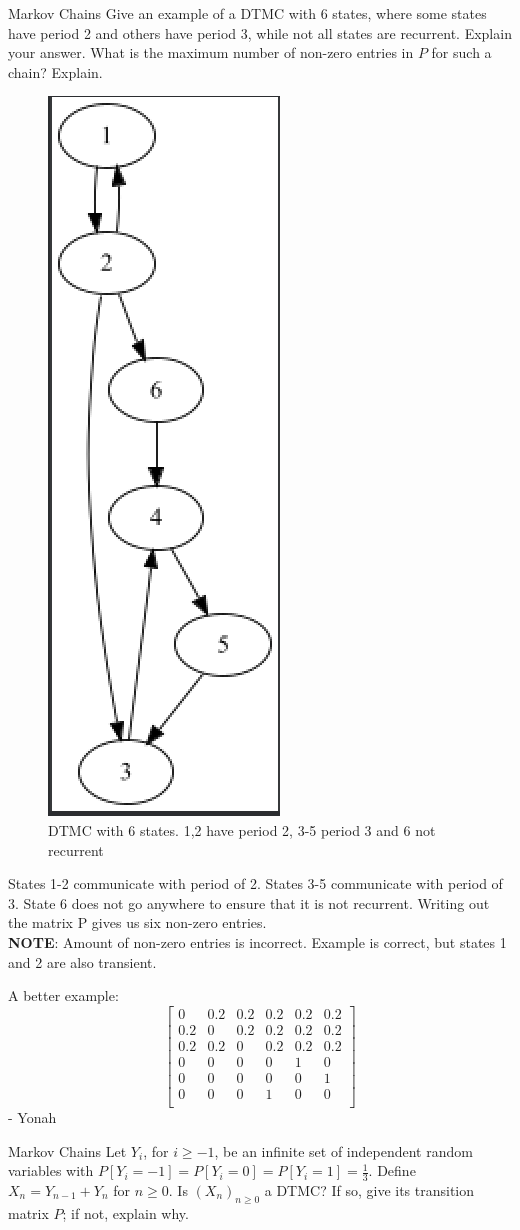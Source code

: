 \begin{problem}{Markov Chains}
Give an example of a DTMC with 6 states, where some states have period 2 and others have period 3, while not all states are recurrent. Explain your answer. What is the maximum number of non-zero entries in \( P \) for such a chain? Explain.
\end{problem}
\begin{solution}
    \begin{figure}[h!]
        \begin{center}
            \includegraphics[height=0.5\textwidth]{img/21.2.png}
        \end{center}
        \caption{DTMC with 6 states. 1,2 have period 2, 3-5 period 3 and 6 not recurrent}
    \end{figure}
States 1-2 communicate with period of 2. States 3-5 communicate with period of 3. State 6 does not go anywhere to ensure that it is not recurrent. Writing out the matrix P gives us six non-zero entries.\\

  \textbf{NOTE}: Amount of non-zero entries is incorrect. Example is correct, but states 1 and 2 are also transient.

  A better example:
  \[
\begin{bmatrix}
  0 & 0.2 & 0.2 & 0.2 & 0.2 & 0.2 \\
  0.2 & 0 & 0.2 & 0.2 & 0.2 & 0.2 \\
  0.2 & 0.2 & 0 & 0.2 & 0.2 & 0.2 \\
  0 & 0 & 0 & 0 & 1 & 0 \\
  0 & 0 & 0 & 0 & 0 & 1 \\
  0 & 0 & 0 & 1 & 0 & 0 \\
\end{bmatrix}
\]- Yonah

\end{solution}
\begin{problem}{Markov Chains}
Let \( Y_i \), for \( i \geq -1 \), be an infinite set of independent random variables with \( P [Y_i = -1] = P [Y_i = 0] = P [Y_i = 1] = \frac{1}{3} \). Define \( X_n = Y_{n-1} + Y_n \) for \( n \geq 0 \). Is \( (X_n)_{n \geq 0} \) a DTMC? If so, give its transition matrix \( P \); if not, explain why.
\end{problem}

